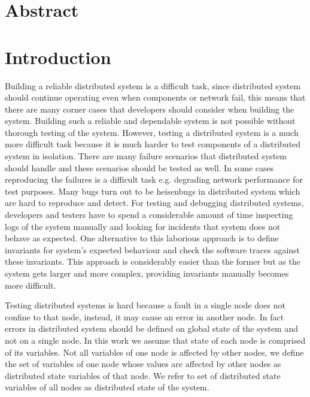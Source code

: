 \section{Abstract}
\section{Introduction}

Building a reliable distributed system is a difficult task, since distributed system should continue operating even when components or network fail, this means that there are many corner cases that developers should consider when building the system. Building such 
a reliable and dependable system is not possible without thorough testing of the system. However, testing a distributed system is a much more difficult task because it is much harder to test components of a distributed system in isolation. There are many 
failure scenarios that distributed system should handle and these scenarios should be tested as well. In some cases reproducing the failures is a difficult task e.g. degrading network performance for test purposes. Many bugs turn out to be heisenbugs in distributed 
system which are hard to reproduce and detect. For testing and debugging distributed systems, developers and testers have to spend a considerable amount of time inspecting logs of the system manually and looking for incidents that system does not behave as 
expected. One alternative to this laborious approach is to define invariants for system's expected behaviour and check the software traces against these invariants. This approach is considerably easier than the former but as the system gets larger and more 
complex, providing invariants manually becomes more difficult.

Testing distributed systems is hard because a fault in a single node does not confine to that node, instead, it may cause an error in another node. In fact errors in distributed system should be defined on global state of the system and not on a single node. In this work we 
assume that state of each node is comprised of its variables. Not all variables of one node is affected by other nodes, we define the set of variables of one node whose values are affected by other nodes as distributed state variables of that node. We refer to set of distributed 
state variables of all nodes as distributed state of the system.


